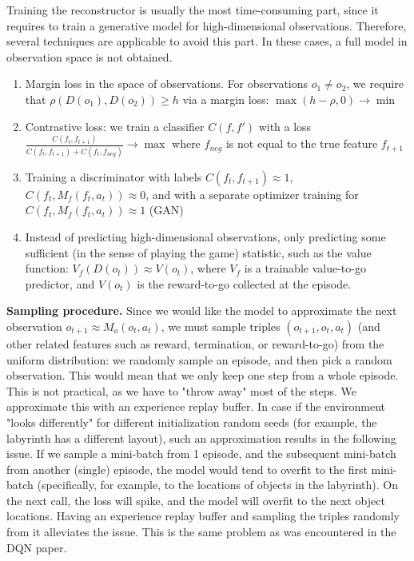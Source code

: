 \documentclass[a4paper,11pt,oneside]{report}
\begin{document}
Training the reconstructor is usually the most time-consuming part, since it requires to train a generative model for high-dimensional observations. Therefore, several techniques are applicable to avoid this part. In these cases, a full model in observation space is not obtained.
\begin{enumerate}
    \item Margin loss in the space of observations. For observations $o_1\neq o_2$, we require that $\rho(D(o_1), D(o_2))\geq h$ via a margin loss: $\max(h-\rho, 0)\to\min$
    \item Contrastive loss: we train a classifier $C(f, f')$ with a loss $\frac{C(f_t, f_{t+1})}{C(f_t, f_{t+1})+C(f_t, f_{neg})}\to\max$ where $f_{neg}$ is not equal to the true feature $f_{t+1}$
    \item Training a discriminator with labels $C(f_t, f_{t+1})\approx 1$, $C(f_t, M_f(f_t, a_t))\approx 0$, and with a separate optimizer training for $C(f_t, M_f(f_t, a_t))\approx 1$ (GAN)
    \item Instead of predicting high-dimensional observations, only predicting some sufficient (in the sense of playing the game) statistic, such as the value function: $V_f(D(o_t))\approx V(o_t)$, where $V_f$ is a trainable value-to-go predictor, and $V(o_t)$ is the reward-to-go collected at the episode.
\end{enumerate}

{\bf Sampling procedure.} Since we would like the model to approximate the next observation $o_{t+1}\approx M_o(o_t, a_t)$, we must sample triples $(o_{t+1}, o_t, a_t)$ (and other related features such as reward, termination, or reward-to-go) from the uniform distribution: we randomly sample an episode, and then pick a random observation. This would mean that we only keep one step from a whole episode. This is not practical, as we have to "throw away" most of the steps. We approximate this with an experience replay buffer. In case if the environment "looks differently" for different initialization random seeds (for example, the labyrinth has a different layout), such an approximation results in the following issue. If we sample a mini-batch from 1 episode, and the subsequent mini-batch from another (single) episode, the model would tend to overfit to the first mini-batch (specifically, for example, to the locations of objects in the labyrinth). On the next call, the loss will spike, and the model will overfit to the next object locations. Having an experience replay buffer and sampling the triples randomly from it alleviates the issue. This is the same problem as was encountered in the DQN paper.
\end{document}
